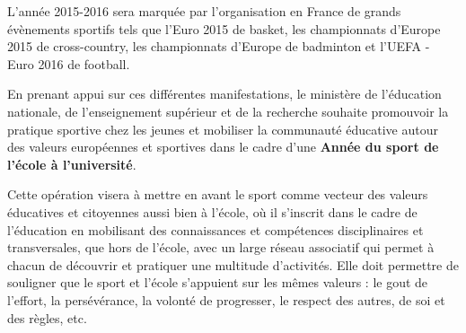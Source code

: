 L’année 2015-2016 sera marquée par l’organisation en France de grands évènements sportifs tels que l’Euro 2015 de basket, les championnats d’Europe 2015 de cross-country, les championnats d’Europe de badminton et l’UEFA - Euro 2016 de football.

En prenant appui sur ces différentes manifestations, le ministère de l’éducation nationale, de l’enseignement supérieur et de la recherche souhaite promouvoir la pratique sportive chez les jeunes et mobiliser la communauté éducative autour des valeurs européennes et sportives dans le cadre d’une \textbf{Année du sport de l’école à l’université}.

Cette opération visera à mettre en avant le sport comme vecteur des valeurs éducatives et citoyennes aussi bien à l’école, où il s’inscrit dans le cadre de l’éducation en mobilisant des connaissances et compétences disciplinaires et transversales, que hors de l’école, avec un large réseau associatif qui permet à chacun de découvrir et pratiquer une multitude d’activités. Elle doit permettre de souligner que le sport et l’école s’appuient sur les mêmes valeurs : le gout de l’effort, la persévérance, la volonté de progresser, le respect des autres, de soi et des règles, etc.  


